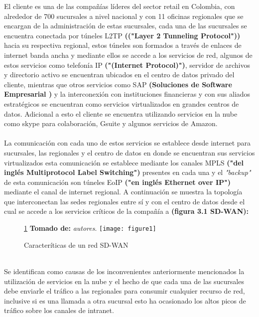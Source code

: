 El cliente es una de las compañías líderes del sector retail en Colombia, con alrededor de 700 sucursales a nivel nacional y con 11 oficinas regionales que se encargan de la administración de estas sucursales, cada una de las sucursales se encuentra  conectada por túneles L2TP \textbf{(("Layer 2 Tunneling Protocol"))} hacia su respectiva regional, estos túneles son formados a través de enlaces de internet banda ancha y mediante ellos se accede a los servicios de red, algunos de estos servicios como telefonía IP \textbf{("(Internet Protocol)")}, servidor de archivos y directorio activo se encuentran ubicados en el centro de datos privado del cliente, mientras que otros servicios como SAP \textbf{(Soluciones de Software Empresarial )} y la interconexión con instituciones financieras y con sus aliados estratégicos se encuentran como servicios virtualizados en grandes centros de datos. Adicional a esto el cliente se encuentra utilizando servicios en la nube como skype para colaboración, Gsuite y algunos servicios de Amazon.
\\
\\
La comunicación con cada uno de estos servicios se establece desde internet para sucursales, las regionales y el centro de datos en donde se encuentran sus servicios virtualizados esta comunicación se establece mediante los canales MPLS \textbf{("del inglés Multiprotocol Label Switching")} presentes en cada una y el \textit{"backup"} de esta comunicación son túneles EoIP \textbf{("en inglés Ethernet over IP")} mediante el canal de internet regional. A continuación se muestra la topología que interconectan las sedes regionales entre sí y con el centro de datos desde el cual se accede a los servicios críticos de la compañía a \textbf{(figura 3.1 SD-WAN):}
\begin{figure}[htbp]
 \ref{fig:sd-wan} \textbf{Tomado de:} \textit{autores}.
   \centering
    {\texttt{[image: figure1]}}%
 \caption{\footnotesize{Caracteríticas de un red SD-WAN}}
  \label{fig:sd-wan}
\end{figure}
\\
Se identifican como causas de los inconvenientes anteriormente mencionados la utilización de servicios en la nube y el hecho de que cada una de las sucursales debe enviarle el tráfico a las regionales para consumir cualquier recurso de red, inclusive si es una llamada a otra sucursal esto ha ocasionado los altos picos de tráfico sobre los canales de intranet.
